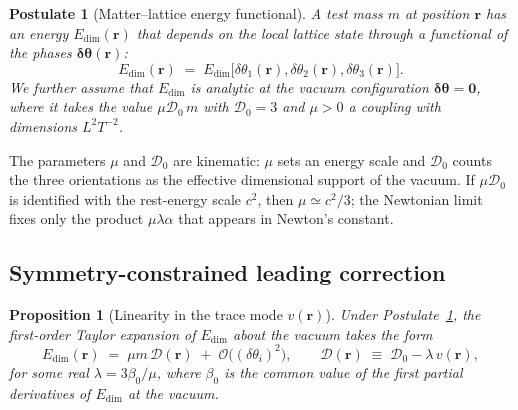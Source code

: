 \documentclass[pdflatex,sn-mathphys-num]{sn-jnl}%
\theoremstyle{thmstyleone}%
\newtheorem{proposition}[theorem]{Proposition}
\theoremstyle{thmstyletwo}%
\theoremstyle{thmstylethree}%
\newtheorem{postulate}{Postulate}%
\begin{document}
\begin{postulate}[Matter--lattice energy functional]
\label{post:coupling}
A test mass $m$ at position $\mathbf{r}$ has an energy
$E_{\mathrm{dim}}(\mathbf{r})$ that depends on the local
lattice state through a functional of the phases
$\boldsymbol{\delta\theta}(\mathbf{r})$:
\begin{equation}
    E_{\mathrm{dim}}(\mathbf{r})
    \;=\;
    E_{\mathrm{dim}}\bigl[\delta\theta_1(\mathbf{r}),
    \delta\theta_2(\mathbf{r}),\delta\theta_3(\mathbf{r})\bigr].
\end{equation}
We further assume that $E_{\mathrm{dim}}$ is analytic at the
vacuum configuration $\boldsymbol{\delta\theta}=\mathbf{0}$,
where it takes the value $\mu\mathcal{D}_0\,m$ with
$\mathcal{D}_0=3$ and $\mu>0$ a coupling with dimensions
$L^2T^{-2}$.
\end{postulate}

The parameters $\mu$ and $\mathcal{D}_0$ are kinematic: $\mu$
sets an energy scale and $\mathcal{D}_0$ counts the three
orientations as the effective dimensional support of the
vacuum. If $\mu\mathcal{D}_0$ is identified with the rest-energy
scale $c^2$, then $\mu\simeq c^2/3$; the Newtonian limit fixes
only the product $\mu\lambda\alpha$ that appears in Newton's
constant.

\subsection{Symmetry-constrained leading correction}

\begin{proposition}[Linearity in the trace mode $v(\mathbf{r})$]
\label{prop:linearity}
Under Postulate~\ref{post:coupling}, the first-order Taylor
expansion of $E_{\mathrm{dim}}$ about the vacuum takes the
form
\begin{equation}
    E_{\mathrm{dim}}(\mathbf{r})
    \;=\;
    \mu m\,\mathcal{D}(\mathbf{r})
    \;+\;
    \mathcal{O}\!\bigl((\delta\theta_i)^2\bigr),
    \qquad
    \mathcal{D}(\mathbf{r})
    \;\equiv\;
    \mathcal{D}_0-\lambda\,v(\mathbf{r}),
    \label{eq:edim_linear}
\end{equation}
for some real $\lambda=3\beta_0/\mu$, where $\beta_0$ is
the common value of the first partial derivatives of
$E_{\mathrm{dim}}$ at the vacuum.
\end{proposition}
\end{document}
